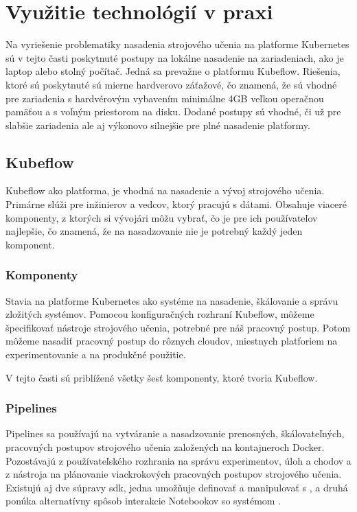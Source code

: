 
\chapter{Využitie technológií v praxi}
\label{methodology}

Na vyriešenie problematiky nasadenia strojového učenia na platforme Kubernetes sú v tejto časti poskytnuté postupy na lokálne nasadenie na zariadeniach, ako je laptop alebo stolný počítač. Jedná sa prevažne o platformu Kubeflow. Riešenia, ktoré sú poskytnuté sú mierne hardverovo záťažové, čo znamená, že sú vhodné pre zariadenia s hardvérovým vybavením minimálne 4GB veľkou operačnou pamäťou a s voľným priestorom na disku. Dodané postupy sú vhodné, či už pre slabšie zariadenia ale aj výkonovo silnejšie pre plné nasadenie platformy.

\section{Kubeflow}
Kubeflow ako platforma, je vhodná na nasadenie a vývoj strojového učenia. Primárne slúži pre inžinierov a vedcov, ktorý pracujú s dátami. Obsahuje viaceré komponenty, z ktorých si vývojári môžu vybrať, čo je pre ich používateľov najlepšie, čo znamená, že na nasadzovanie nie je potrebný každý jeden komponent.

\subsection{Komponenty}

Stavia na platforme Kubernetes ako systéme na nasadenie, škálovanie a správu zložitých systémov. Pomocou konfiguračných rozhraní Kubeflow, môžeme špecifikovať nástroje strojového učenia, potrebné pre náš pracovný postup. Potom môžeme nasadiť pracovný postup do rôznych cloudov, miestnych platforiem na experimentovanie a na produkčné použitie.

V tejto časti sú priblížené všetky šesť komponenty, ktoré tvoria Kubeflow.


\subsection*{Pipelines}

Pipelines sa používajú na vytváranie a nasadzovanie prenosných, škálovateľných, pracovných postupov strojového učenia založených na kontajneroch Docker. Pozostávajú z používateľského rozhrania na správu experimentov, úloh a chodov a z nástroja na plánovanie viackrokových pracovných postupov strojového učenia. Existujú aj dve súpravy \acrshort{sdk}, jedna umožňuje definovať a manipulovať s , a druhá ponúka alternatívny spôsob interakcie Notebookov so systémom \cite{pipe}.

